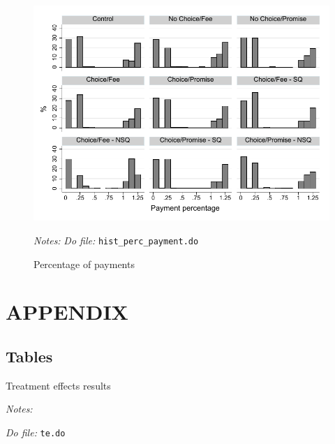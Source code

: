 \documentclass[11pt]{article}
\begin{document}
\begin{figure}[H]
        \caption{Percentage of payments}
    \label{HistPayments}
    \begin{center}
        \centering
        \includegraphics[width=\textwidth]{Figuras/hist_perc_payment.pdf}
    \end{center}
     \footnotesize \textit{Notes: } 
      \footnotesize{ \textit{Do file: }  \texttt{hist\_perc\_payment.do}}
\end{figure}

\pagebreak




\section{APPENDIX}

\subsection{Tables}

\begin{landscape}
\begin{table}[H]
\caption{Treatment effects results}
\label{te_table}
\begin{center}
\scriptsize{}
\end{center}
 \footnotesize
\textit{Notes:} 

\textit{Do file: } \texttt{te.do}
\end{table}


\end{landscape}
\end{document}
